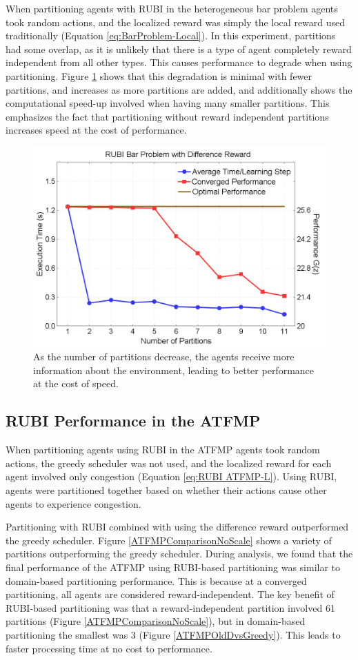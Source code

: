 \documentclass[smallcondensed]{svjour3}
\begin{document}
When partitioning agents with RUBI in the heterogeneous bar problem agents took random actions, and the localized reward was simply the local reward used traditionally (Equation \ref{eq:BarProblem-Local}). In this experiment, partitions had some overlap, as it is unlikely that there is a type of agent completely reward independent from all other types. This causes performance to degrade when using partitioning. Figure \ref{BarProblemNewPartitions} shows that this degradation is minimal with fewer partitions, and increases as more partitions are added, and additionally shows the computational speed-up involved when having many smaller partitions. This emphasizes the fact that partitioning without reward independent partitions increases speed at the cost of performance.

\begin{figure}
\centering
\includegraphics[width=.75\columnwidth]{BarProblemComparisonNoScale}
\caption{As the number of partitions decrease, the agents receive more information about the environment, leading to better performance at the cost of speed. }
\label{BarProblemNewPartitions}
\end{figure}

\subsection{RUBI Performance in the ATFMP}

When partitioning agents using RUBI in the ATFMP agents took random actions, the greedy scheduler was not used, and the localized reward for each agent involved only congestion (Equation \ref{eq:RUBI ATFMP-L}). Using RUBI, agents were partitioned together based on whether their actions cause other agents to experience congestion. 

Partitioning with RUBI combined with using the difference reward outperformed the greedy scheduler. Figure \ref{ATFMPComparisonNoScale} shows a variety of partitions outperforming the greedy scheduler. During analysis, we found that the final performance of the ATFMP using RUBI-based partitioning was similar to domain-based partitioning performance. This is because at a converged partitioning, all agents are considered reward-independent. The key benefit of RUBI-based partitioning was that a reward-independent partition involved 61 partitions (Figure \ref{ATFMPComparisonNoScale}), but in domain-based partitioning the smallest was 3 (Figure \ref{ATFMPOldDvsGreedy}). This leads to faster processing time at no cost to performance.
\end{document}
